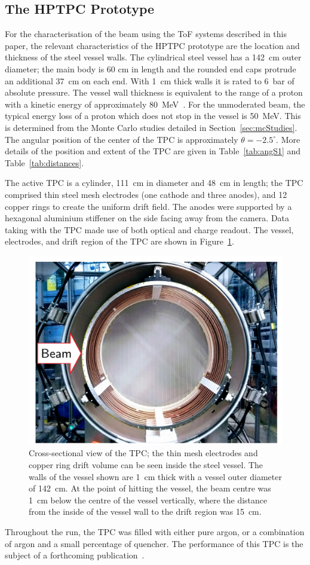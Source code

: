 \subsection{The HPTPC Prototype}
For the characterisation of the beam using the ToF systems described in this paper, the relevant characteristics of the HPTPC prototype are the location and thickness of the steel vessel walls.
The cylindrical steel vessel has a 142~cm outer diameter; the main body is 60 cm in length and the rounded end caps protrude an additional 37~cm on each end.
With 1~cm thick walls it is rated to 6~bar of absolute pressure.
The vessel wall thickness is equivalent to the range of a proton with a kinetic energy of approximately 80~MeV~\cite{rangeTables}.
For the unmoderated beam, the typical energy loss of a proton which does not stop in the vessel is 50~MeV.
This is determined from the Monte Carlo studies detailed in Section~\ref{sec:mcStudies}.
The angular position of the center of the TPC is approximately $\theta = -2.5^{\circ}$. 
More details of the position and extent of the TPC are given in Table~\ref{tab:angS1} and Table~\ref{tab:distances}.
 
The active TPC is a cylinder, 111~cm in diameter and 48~cm in length; the TPC comprised thin steel mesh electrodes (one cathode and three anodes), and 12 copper rings to create the uniform drift field. The anodes were supported by a hexagonal aluminium stiffener on the side facing away from the camera.
Data taking with the TPC made use of both optical and charge readout.
The vessel, electrodes, and drift region of the TPC are shown in Figure~\ref{fig:TPC}.

\begin{figure}
  \centering
  \includegraphics[width=.8\linewidth]{files/Figures/vesselView.pdf}
  \caption{Cross-sectional view of the TPC; the thin mesh electrodes and copper ring drift volume can be seen inside the steel vessel. The walls of the vessel shown are 1~cm thick with a vessel outer diameter of 142~cm. At the point of hitting the vessel, the beam centre was 1~cm below the centre of the vessel vertically, where the distance from the inside of the vessel wall to the drift region was 15~cm.}
   \label{fig:TPC}
\end{figure}

Throughout the run, the TPC was filled with either pure argon, or a combination of argon and a small percentage of quencher.
The performance of this TPC is the subject of a forthcoming publication~\cite{Deisting:2020aaa}.
